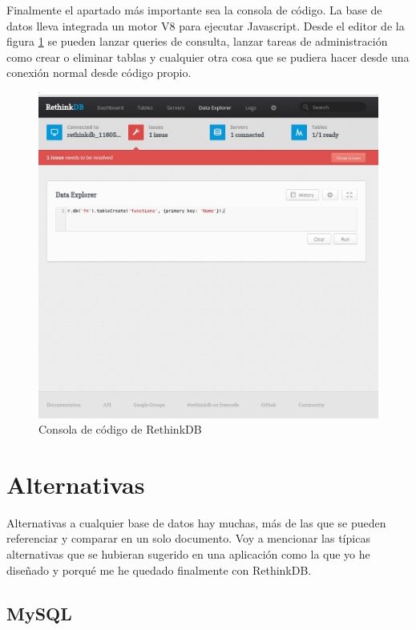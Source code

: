 Finalmente el apartado más importante sea la consola de código. La base de datos lleva integrada un motor V8 para ejecutar Javascript. Desde el editor de la figura \ref{fig:rethinkdb-code} se pueden lanzar queries de consulta, lanzar tareas de administración como crear o eliminar tablas y cualquier otra cosa que se pudiera hacer desde una conexión normal desde código propio.

\begin{figure}[H]
    \centering
    \includegraphics[width=\textwidth]{../images/rethinkdb/code.png}
    \caption{Consola de código de RethinkDB}
    \label{fig:rethinkdb-code}
\end{figure}

\section{Alternativas}
\label{sec:rethinkdb-alternativas}

Alternativas a cualquier base de datos hay muchas, más de las que se pueden referenciar y comparar en un solo documento. Voy a mencionar las típicas alternativas que se hubieran sugerido en una aplicación como la que yo he diseñado y porqué me he quedado finalmente con RethinkDB.

\subsection{MySQL}

